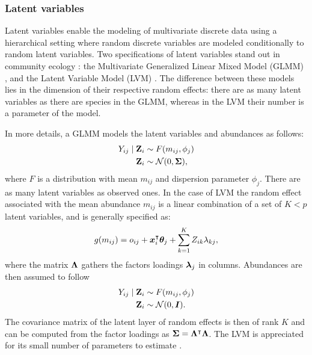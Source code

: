 \subsubsection{Latent variables}

Latent variables enable the modeling of multivariate discrete data using a hierarchical setting where random discrete variables are modeled conditionally to random latent variables.  Two specifications of  latent variables stand out in community ecology \citep{WBO15}:  the Multivariate Generalized Linear Mixed Model (GLMM) \citep{OHS10, PTM14}, and the Latent Variable Model (LVM)  \citep{OAP16, OTN17}. The difference between these models lies in the dimension of their respective random effects: there are as many latent variables as there are species in the GLMM, whereas in the LVM their number is a parameter of the model. 


In more details, a GLMM models the latent variables and abundances as follows:
 \begin{align*}
 Y_{ij}\mid {\bf Z}_i &\sim F(m_{ij}, \phi_j)\\
 {\bf Z}_i &\sim \mathcal{N}(0, {\boldsymbol{\Sigma}}),
 \end{align*} 
 where $F$ is a distribution with mean $m_{ij}$ and dispersion parameter $\phi_j$. There are as many latent variables as observed ones. In the case of LVM the random effect associated with the mean abundance $m_{ij}$ is a linear combination of a set of $K<p$  latent variables, and is generally specified as:
 $$g(m_{ij}) = o_{ij}+{\boldsymbol{x}}_i^\intercal  {\boldsymbol{\theta}}_j +\sum_{k=1}^K Z_{ik} \lambda_{kj},$$
 where the matrix ${\boldsymbol{\Lambda}}$ gathers the factors loadings ${\boldsymbol{\lambda}}_j$ in columns. Abundances are then assumed to follow
 \begin{align*}
 Y_{ij}\mid {\bf Z}_i &\sim F(m_{ij}, \phi_j)\\
{\bf Z}_i&\sim \mathcal{N}(0, \boldsymbol{I}).
 \end{align*}
The covariance matrix of the latent layer of random effects  is then of rank $K$ and can be computed from the factor loadings as ${\boldsymbol{\Sigma}}={\boldsymbol{\Lambda}}^\intercal {\boldsymbol{\Lambda}}$. The LVM is appreciated for its small number of parameters to estimate \citep{OTN17}.\\

